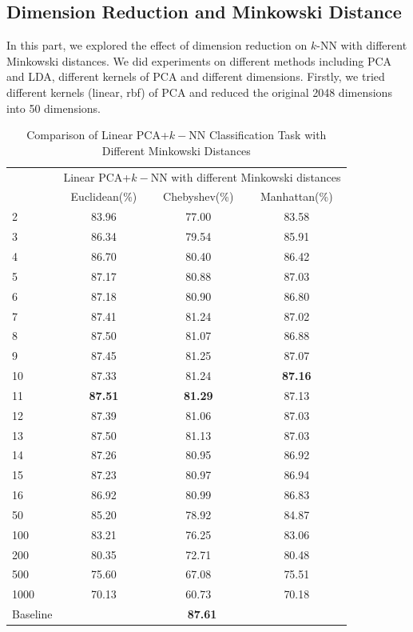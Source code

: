 \documentclass[conference]{IEEEtran}
\begin{document}
\subsection{Dimension Reduction and Minkowski Distance}
In this part, we explored the effect of dimension reduction on $k$-NN with different Minkowski distances. We did experiments on different methods including PCA and LDA, different kernels of PCA and different dimensions.
Firstly, we tried different kernels (linear, rbf) of PCA and reduced the original 2048 dimensions into 50 dimensions.
\begin{table}[htbp]
	\centering
 	\newcommand{\tabincell}[2]{\begin{tabular}{@{}#1@{}}#2\end{tabular}}
 	\renewcommand\arraystretch{1.0}
 	\caption{Comparison of Linear PCA+$k-$NN Classification Task with Different Minkowski Distances}
 	\label{base1}%
 		\begin{tabular}{@{}p{1cm}<{\centering}|c|c|c}
 		\hline
 		\multirow{2}{*}{\diagbox[height=2\line,width=1.42cm,font=\tiny]{$k$}{Acc.}{$\mathit{M}$}} &
 		\multicolumn{3}{c}{Linear PCA+$k-$NN with different Minkowski distances}\\
 		\cline{2-4}
			& Euclidean(\%) & Chebyshev(\%) & Manhattan(\%)\\
 		\hline
 		2   & 83.96 & 77.00 & 83.58 \\
 		3   & 86.34 & 79.54 & 85.91 \\
 		4   & 86.70 & 80.40 & 86.42 \\
 		5   & 87.17 & 80.88 & 87.03 \\
 		6   & 87.18 & 80.90 & 86.80 \\
 		7   & 87.41 & 81.24 & 87.02 \\
 		8   & 87.50 & 81.07 & 86.88 \\ 
 		9   & 87.45 & 81.25 & 87.07 \\
 		10   & 87.33 & 81.24 & \textbf{87.16} \\
 		11   & \textbf{87.51} & \textbf{81.29} & 87.13 \\
 		12   & 87.39 & 81.06 & 87.03 \\
 		13   & 87.50 & 81.13 & 87.03 \\
 		14   & 87.26 & 80.95 & 86.92 \\
 		15   & 87.23 & 80.97 & 86.94 \\
		16   & 86.92 & 80.99 & 86.83 \\
		50   & 85.20 & 78.92 & 84.87 \\
		100   & 83.21 & 76.25 & 83.06 \\
		200   & 80.35 & 72.71 & 80.48 \\
		500   & 75.60 & 67.08 & 75.51 \\
		1000   & 70.13 & 60.73 & 70.18 \\
		\hline
 		Baseline & \multicolumn{3}{c}{\textbf{87.61}} \\
		\hline
		\end{tabular}
\end{table}
\end{document}
